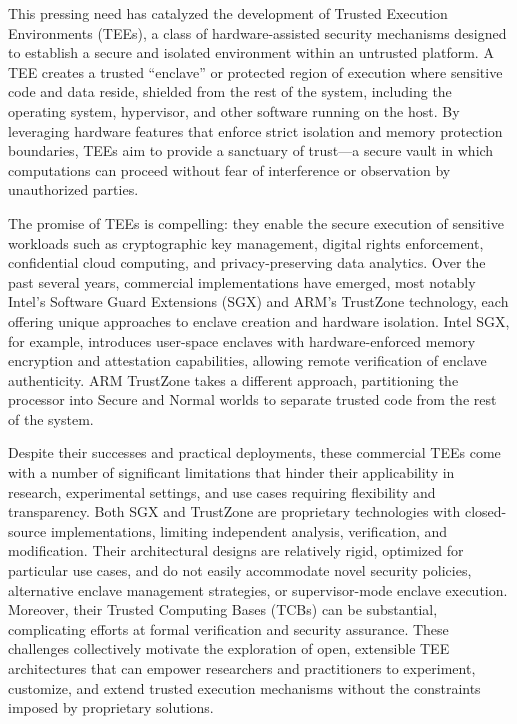 This pressing need has catalyzed the development of Trusted Execution Environments (TEEs), a class of hardware-assisted security mechanisms designed to establish a secure and isolated environment within an untrusted platform. A TEE creates a trusted “enclave” or protected region of execution where sensitive code and data reside, shielded from the rest of the system, including the operating system, hypervisor, and other software running on the host. By leveraging hardware features that enforce strict isolation and memory protection boundaries, TEEs aim to provide a sanctuary of trust—a secure vault in which computations can proceed without fear of interference or observation by unauthorized parties.

The promise of TEEs is compelling: they enable the secure execution of sensitive workloads such as cryptographic key management, digital rights enforcement, confidential cloud computing, and privacy-preserving data analytics. Over the past several years, commercial implementations have emerged, most notably Intel’s Software Guard Extensions (SGX) and ARM’s TrustZone technology, each offering unique approaches to enclave creation and hardware isolation. Intel SGX, for example, introduces user-space enclaves with hardware-enforced memory encryption and attestation capabilities, allowing remote verification of enclave authenticity. ARM TrustZone takes a different approach, partitioning the processor into Secure and Normal worlds to separate trusted code from the rest of the system.

Despite their successes and practical deployments, these commercial TEEs come with a number of significant limitations that hinder their applicability in research, experimental settings, and use cases requiring flexibility and transparency. Both SGX and TrustZone are proprietary technologies with closed-source implementations, limiting independent analysis, verification, and modification. Their architectural designs are relatively rigid, optimized for particular use cases, and do not easily accommodate novel security policies, alternative enclave management strategies, or supervisor-mode enclave execution. Moreover, their Trusted Computing Bases (TCBs) can be substantial, complicating efforts at formal verification and security assurance. These challenges collectively motivate the exploration of open, extensible TEE architectures that can empower researchers and practitioners to experiment, customize, and extend trusted execution mechanisms without the constraints imposed by proprietary solutions.

